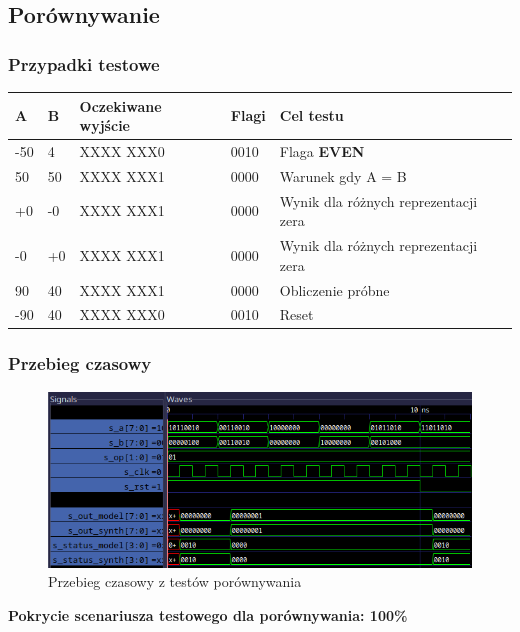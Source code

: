 \documentclass[12pt]{article}
\begin{document}
	
	\subsection*{Porównywanie}
	\subsubsection*{Przypadki testowe}
\begin{table}[H]
	\centering
	\begin{tabular}{|l|l|l|l|l|}
		\hline
		\textbf{A} & \textbf{B} & \textbf{Oczekiwane wyjście} & \textbf{Flagi} & \textbf{Cel testu} \\ \hline
		-50 & 4 & XXXX XXX0 & 0010 & Flaga \textbf{EVEN} \\ \hline
		50 & 50 & XXXX XXX1 & 0000 & Warunek gdy A = B \\ \hline
		+0 & -0 & XXXX XXX1 & 0000 & Wynik dla różnych reprezentacji zera \\ \hline
		-0 & +0 & XXXX XXX1 & 0000 & Wynik dla różnych reprezentacji zera \\ \hline
		90 & 40 & XXXX XXX1 & 0000& Obliczenie próbne \\ \hline
		-90 & 40 & XXXX XXX0 & 0010 & Reset \\ \hline
	\end{tabular}
\end{table}

	\subsubsection*{Przebieg czasowy}
			\begin{figure}[H]
		\begin{center}
			\includegraphics[width=\textwidth]{../Testy/Wyniki_testow/Testy_comp.png}
			\caption*{Przebieg czasowy z testów porównywania}
			\label{figure:test_comp}
		\end{center}
	\end{figure}
	\vspace{-20pt}
	\textbf{Pokrycie scenariusza testowego dla porównywania: 100\%}
	
\end{document}
